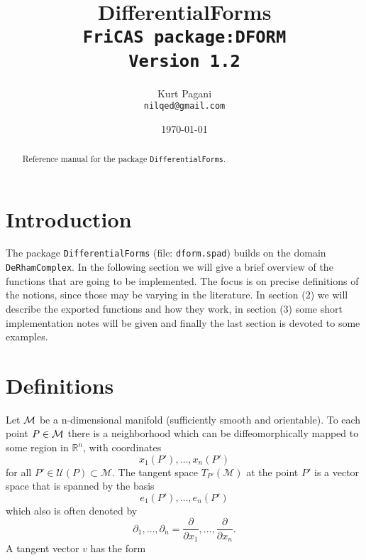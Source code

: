 \documentclass[12pt,a4paper]{article}
\author{Kurt Pagani \\ {\tt nilqed@gmail.com}}
\date{\today}
\title{DifferentialForms \\ {\small\tt FriCAS package:DFORM \\ Version 1.2}}
\newcommand{\RR}[1]{\mathbb{R}^{#1}}
\begin{document}
\maketitle
%
\begin{abstract}
Reference manual for the package {\tt DifferentialForms}.
\end{abstract}
%
\tableofcontents
%
\section{Introduction}
The package {\tt DifferentialForms} (file: {\tt dform.spad}) builds on the
domain {\tt DeRhamComplex}. In the following section we will give a brief 
overview of the functions that are going to be implemented. The focus is 
on precise definitions of the notions, since those may be varying in the 
literature. In section (2) we will describe the exported functions and 
how they work, in section (3) some short implementation notes will be 
given and finally the last section is devoted to some examples.
%
\section{Definitions}
Let ${\cal M}$ be a n-dimensional manifold (sufficiently smooth and orientable). 
To each point $P\in{\cal M}$ there is a neighborhood which can be 
diffeomorphically mapped to some region in $\RR n$, with coordinates
\begin{displaymath}
   x_1 (P'), \ldots, x_n (P')
\end{displaymath}
for all $P' \in \mathcal{U} (P) \subset \mathcal{M}$. The tangent space
$T_{P'} (\mathcal{M})$ at the point $P'$ is a vector space that 
is spanned by the basis
\begin{displaymath}
    e_1 (P'), \ldots, e_n (P')
\end{displaymath}
which also is often denoted by 
\begin{displaymath}
   \partial_1, \ldots, \partial_n =
   \frac{\partial}{\partial x_1}, \ldots, 
   \frac{\partial}{\partial x_n}.  
\end{displaymath}
A tangent vector $v$ has the form
\end{document}
